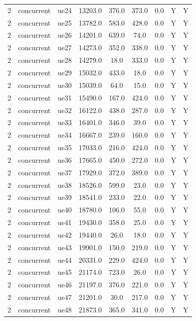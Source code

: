 \begin{table}[ht]
\begin{tabular}{|c|c|c|c|c|c|c|c|c|}
2 & concurrent & ue24 & 13203.0 & 376.0 & 373.0 & 0.0 & Y & Y \\
2 & concurrent & ue25 & 13782.0 & 583.0 & 428.0 & 0.0 & Y & Y \\
2 & concurrent & ue26 & 14201.0 & 639.0 & 74.0 & 0.0 & Y & Y \\
2 & concurrent & ue27 & 14273.0 & 352.0 & 338.0 & 0.0 & Y & Y \\
2 & concurrent & ue28 & 14279.0 & 18.0 & 333.0 & 0.0 & Y & Y \\
2 & concurrent & ue29 & 15032.0 & 433.0 & 18.0 & 0.0 & Y & Y \\
2 & concurrent & ue30 & 15039.0 & 64.0 & 15.0 & 0.0 & Y & Y \\
2 & concurrent & ue31 & 15490.0 & 167.0 & 424.0 & 0.0 & Y & Y \\
2 & concurrent & ue32 & 16122.0 & 438.0 & 287.0 & 0.0 & Y & Y \\
2 & concurrent & ue33 & 16401.0 & 346.0 & 39.0 & 0.0 & Y & Y \\
2 & concurrent & ue34 & 16667.0 & 239.0 & 160.0 & 0.0 & Y & Y \\
2 & concurrent & ue35 & 17033.0 & 216.0 & 424.0 & 0.0 & Y & Y \\
2 & concurrent & ue36 & 17665.0 & 450.0 & 272.0 & 0.0 & Y & Y \\
2 & concurrent & ue37 & 17929.0 & 372.0 & 389.0 & 0.0 & Y & Y \\
2 & concurrent & ue38 & 18526.0 & 599.0 & 23.0 & 0.0 & Y & Y \\
2 & concurrent & ue39 & 18541.0 & 233.0 & 22.0 & 0.0 & Y & Y \\
2 & concurrent & ue40 & 18780.0 & 106.0 & 55.0 & 0.0 & Y & Y \\
2 & concurrent & ue41 & 19430.0 & 358.0 & 25.0 & 0.0 & Y & Y \\
2 & concurrent & ue42 & 19440.0 & 26.0 & 18.0 & 0.0 & Y & Y \\
2 & concurrent & ue43 & 19901.0 & 150.0 & 219.0 & 0.0 & Y & Y \\
2 & concurrent & ue44 & 20331.0 & 229.0 & 424.0 & 0.0 & Y & Y \\
2 & concurrent & ue45 & 21174.0 & 723.0 & 26.0 & 0.0 & Y & Y \\
2 & concurrent & ue46 & 21197.0 & 376.0 & 221.0 & 0.0 & Y & Y \\
2 & concurrent & ue47 & 21201.0 & 30.0 & 217.0 & 0.0 & Y & Y \\
2 & concurrent & ue48 & 21873.0 & 365.0 & 341.0 & 0.0 & Y & Y \\

\end{tabular}
\end{table}
